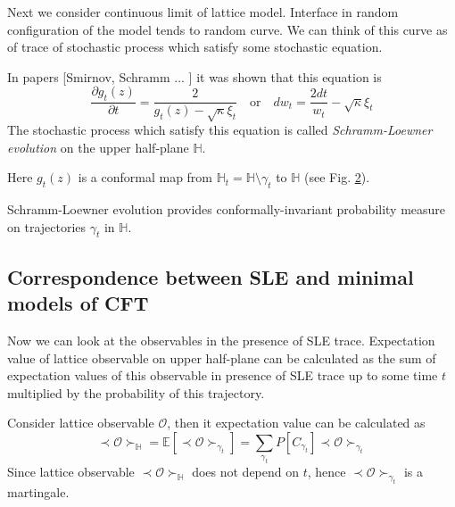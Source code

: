 \begin{figure}[h]
  \label{fig:sle}
\end{figure}

Next we consider continuous limit of lattice model. Interface in random configuration of the model tends to random curve. We can think of this curve as of trace of stochastic process which satisfy some stochastic equation. 

In papers [Smirnov, Schramm ... ] it was shown that this equation is
\begin{equation*}
  \frac{\partial g_t(z)}{\partial t} = \frac{ 2}{g_t(z)-\sqrt{\kappa}\xi_{t}} \quad \text{or} \quad       d w _{t}= \frac{2dt}{w_{t} }-\sqrt{\kappa}\xi_{t}
\end{equation*}
The stochastic process which satisfy this equation is called     {\it Schramm-Loewner evolution} on the upper half-plane $\mathbb{H}$.

Here $g_{t}(z)$ is a conformal map from $\mathbb{H}_{t}=\mathbb{H}\setminus \gamma_{t}$ to $\mathbb{H}$ (see Fig. \ref{fig:sle2}).
\begin{figure}[h]
  \label{fig:sle2}
\end{figure}

Schramm-Loewner evolution provides conformally-invariant probability measure on trajectories $\gamma_{t}$ in $\mathbb{H}$.

\subsection{Correspondence between SLE and minimal models of CFT}

Now we can look at the observables in the presence of SLE trace. Expectation value of lattice observable on upper half-plane can be calculated as the sum of expectation values of this observable in presence of SLE trace up to some time $t$ multiplied by the probability of this trajectory. 

Consider lattice observable $\mathcal{O}$, then it expectation value can be calculated as
\begin{equation*}
  \prec \mathcal{O} \succ_{\mathbb{H}}=\mathbb{E}\left[\prec\mathcal{O}\succ_{\gamma_{t}}\right]=\sum_{\gamma_{t}} P\left[C_{\gamma_{t}}\right] \prec \mathcal{O} \succ_{\gamma_{t}}
\end{equation*}
Since lattice observable  $\prec \mathcal{O} \succ_{\mathbb{H}}$ does not depend on $t$, hence $\prec\mathcal{O}\succ_{\gamma_{t}}$ is a martingale.

